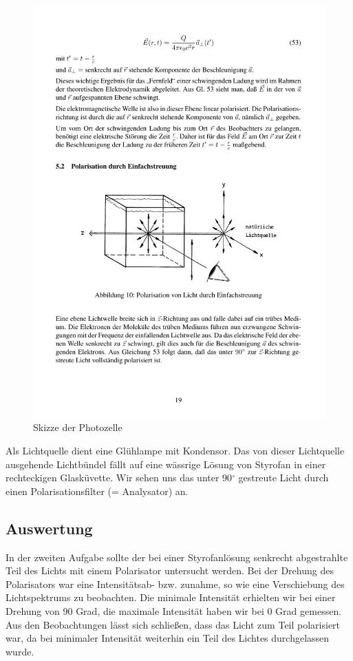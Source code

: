 \documentclass[12pt]{scrartcl}
\begin{document}
\begin{figure}[H] 
  \centering
    \includegraphics[trim = 0mm 65mm 0mm 90mm, clip, scale = 1]{abb_10.pdf}
  	\caption[Skizze der Photozelle]{Skizze der Photozelle\footnotemark}
  \label{fig:abb_10}
\end{figure}

Als Lichtquelle dient eine Glühlampe mit Kondensor. Das von dieser Lichtquelle ausgehende Lichtbündel fällt auf eine wässrige Lösung von Styrofan in einer rechteckigen Glasküvette.
Wir sehen uns das unter
90$^\circ$ gestreute Licht durch einen Polarisationsfilter (= Analysator) an. 
\subsection{Auswertung}
In der zweiten Aufgabe sollte der bei einer Styrofanlösung senkrecht abgestrahlte Teil des Lichts mit einem Polarisator untersucht werden. Bei der Drehung des Polarisators war eine Intensitätsab- bzw. zunahme, so wie eine Verschiebung des Lichtspektrums zu beobachten. Die minimale Intensität erhielten wir bei einer Drehung von 90 Grad, die maximale Intensität haben wir bei 0 Grad gemessen. Aus den Beobachtungen lässt sich schließen, dass das Licht zum Teil polarisiert war, da bei minimaler Intensität weiterhin ein Teil des Lichtes durchgelassen wurde.
\end{document}
